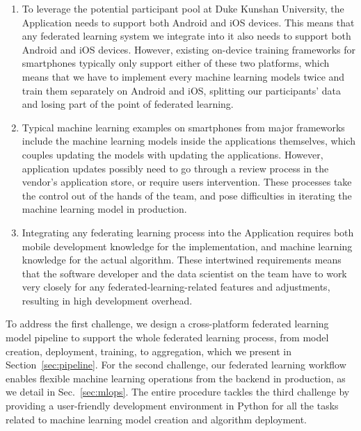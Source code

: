 \begin{enumerate}
\item To leverage the potential participant pool at Duke Kunshan University,
    the \fedcampus Application needs to support both Android and iOS devices.
    This means that any federated learning system we integrate into it
    also needs to support both Android and iOS devices.
    However, existing on-device training frameworks for smartphones typically
    only support either of these two platforms,
    which means that we have to implement every machine learning models twice
    and train them separately on Android and iOS,
    splitting our participants' data and
    losing part of the point of federated learning.
\item Typical machine learning examples on smartphones from major frameworks
    include the machine learning models inside the applications themselves,
    which couples updating the models with updating the applications.
    However, application updates possibly need to go through a review process
    in the vendor's application store, or require users intervention.
    These processes take the control out of the hands of the \fedcampus team,
    and pose difficulties in iterating the machine learning model in production.
\item Integrating any federating learning process into
    the \fedcampus Application requires both mobile development knowledge
    for the implementation,
    and machine learning knowledge for the actual algorithm.
    These intertwined requirements means that the software developer and
    the data scientist on the \fedcampus team have to work very closely for
    any federated-learning-related features and adjustments,
    resulting in high development overhead.
\end{enumerate}

To address the first challenge,
we design a cross-platform federated learning model pipeline to
support the whole federated learning process,
from model creation, deployment, training, to aggregation,
which we present in Section~\ref{sec:pipeline}.
For the second challenge,
our federated learning workflow enables flexible machine learning operations
from the backend in production,
as we detail in Sec.~\ref{sec:mlops}.
The entire procedure tackles the third challenge by
providing a user-friendly development environment in Python for
all the tasks related to machine learning model creation and
algorithm deployment.

